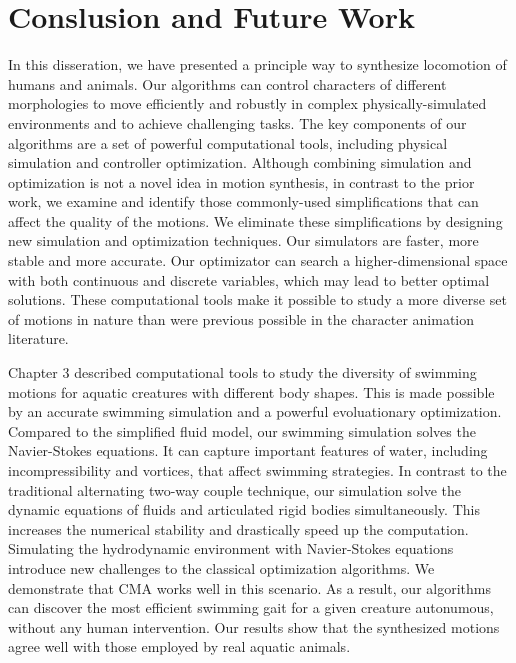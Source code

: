 \chapter{Conslusion and Future Work}

In this disseration, we have presented a principle way to synthesize locomotion of humans and animals. Our algorithms can control characters of different morphologies to move efficiently and robustly in complex physically-simulated environments and to achieve challenging tasks. The key components of our algorithms are a set of powerful computational tools, including physical simulation and controller optimization. Although combining simulation and optimization is not a novel idea in motion synthesis, in contrast to the prior work, we examine and identify those commonly-used simplifications that can affect the quality of the motions. We eliminate these simplifications by designing new simulation and optimization techniques. Our simulators are faster, more stable and more accurate. Our optimizator can search a higher-dimensional space with both continuous and discrete variables, which may lead to better optimal solutions. These computational tools make it possible to study a more diverse set of motions in nature than were previous possible in the character animation literature.

Chapter 3 described computational tools to study the diversity of swimming motions for aquatic creatures with different body shapes. This is made possible by an accurate swimming simulation and a powerful evoluationary optimization. Compared to the simplified fluid model, our swimming simulation solves the Navier-Stokes equations. It can capture important features of water, including incompressibility and vortices, that affect swimming strategies. In contrast to the traditional alternating two-way couple technique, our simulation solve the dynamic equations of fluids and articulated rigid bodies simultaneously. This increases the numerical stability and drastically speed up the computation. Simulating the hydrodynamic environment with Navier-Stokes equations introduce new challenges to the classical optimization algorithms. We demonstrate that CMA works well in this scenario. As a result, our algorithms can discover the most efficient swimming gait for a given creature autonumous, without any human intervention. Our results show that the synthesized motions agree well with those employed by real aquatic animals.

